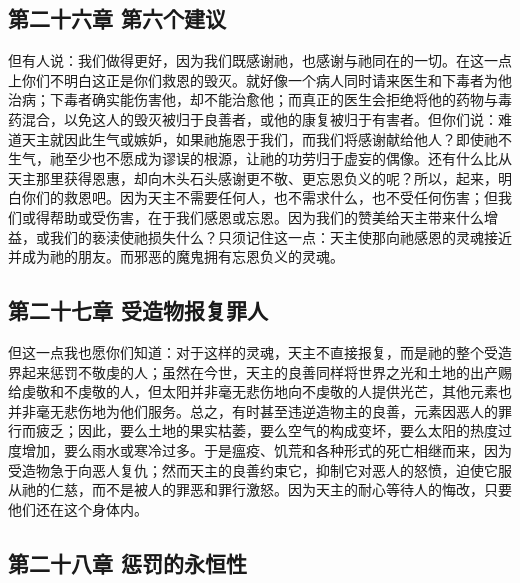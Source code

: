 
\subsection{第二十六章 第六个建议}

但有人说：我们做得更好，因为我们既感谢祂，也感谢与祂同在的一切。在这一点上你们不明白这正是你们救恩的毁灭。就好像一个病人同时请来医生和下毒者为他治病；下毒者确实能伤害他，却不能治愈他；而真正的医生会拒绝将他的药物与毒药混合，以免这人的毁灭被归于良善者，或他的康复被归于有害者。但你们说：难道天主就因此生气或嫉妒，如果祂施恩于我们，而我们将感谢献给他人？即使祂不生气，祂至少也不愿成为谬误的根源，让祂的功劳归于虚妄的偶像。还有什么比从天主那里获得恩惠，却向木头石头感谢更不敬、更忘恩负义的呢？所以，起来，明白你们的救恩吧。因为天主不需要任何人，也不需求什么，也不受任何伤害；但我们或得帮助或受伤害，在于我们感恩或忘恩。因为我们的赞美给天主带来什么增益，或我们的亵渎使祂损失什么？只须记住这一点：天主使那向祂感恩的灵魂接近并成为祂的朋友。而邪恶的魔鬼拥有忘恩负义的灵魂。\par


\subsection{第二十七章 受造物报复罪人}

但这一点我也愿你们知道：对于这样的灵魂，天主不直接报复，而是祂的整个受造界起来惩罚不敬虔的人；虽然在今世，天主的良善同样将世界之光和土地的出产赐给虔敬和不虔敬的人，但太阳并非毫无悲伤地向不虔敬的人提供光芒，其他元素也并非毫无悲伤地为他们服务。总之，有时甚至违逆造物主的良善，元素因恶人的罪行而疲乏；因此，要么土地的果实枯萎，要么空气的构成变坏，要么太阳的热度过度增加，要么雨水或寒冷过多。于是瘟疫、饥荒和各种形式的死亡相继而来，因为受造物急于向恶人复仇；然而天主的良善约束它，抑制它对恶人的怒愤，迫使它服从祂的仁慈，而不是被人的罪恶和罪行激怒。因为天主的耐心等待人的悔改，只要他们还在这个身体内。\par


\subsection{第二十八章 惩罚的永恒性}

